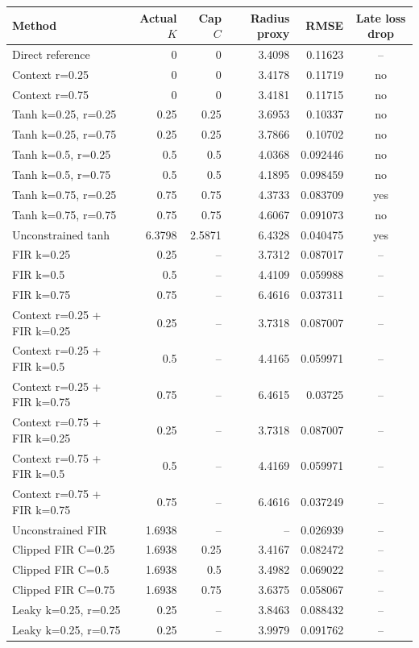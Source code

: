\begin{tabular}{lrrrrc}\toprule
Method & Actual $K$ & Cap $C$ & Radius proxy & RMSE & Late loss drop\\\midrule
Direct reference & 0 & 0 & 3.4098 & 0.11623 & -- \\
Context r=0.25 & 0 & 0 & 3.4178 & 0.11719 & no \\
Context r=0.75 & 0 & 0 & 3.4181 & 0.11715 & no \\
Tanh k=0.25, r=0.25 & 0.25 & 0.25 & 3.6953 & 0.10337 & no \\
Tanh k=0.25, r=0.75 & 0.25 & 0.25 & 3.7866 & 0.10702 & no \\
Tanh k=0.5, r=0.25 & 0.5 & 0.5 & 4.0368 & 0.092446 & no \\
Tanh k=0.5, r=0.75 & 0.5 & 0.5 & 4.1895 & 0.098459 & no \\
Tanh k=0.75, r=0.25 & 0.75 & 0.75 & 4.3733 & 0.083709 & yes \\
Tanh k=0.75, r=0.75 & 0.75 & 0.75 & 4.6067 & 0.091073 & no \\
Unconstrained tanh & 6.3798 & 2.5871 & 6.4328 & 0.040475 & yes \\
FIR k=0.25 & 0.25 & -- & 3.7312 & 0.087017 & -- \\
FIR k=0.5 & 0.5 & -- & 4.4109 & 0.059988 & -- \\
FIR k=0.75 & 0.75 & -- & 6.4616 & 0.037311 & -- \\
Context r=0.25 + FIR k=0.25 & 0.25 & -- & 3.7318 & 0.087007 & -- \\
Context r=0.25 + FIR k=0.5 & 0.5 & -- & 4.4165 & 0.059971 & -- \\
Context r=0.25 + FIR k=0.75 & 0.75 & -- & 6.4615 & 0.03725 & -- \\
Context r=0.75 + FIR k=0.25 & 0.25 & -- & 3.7318 & 0.087007 & -- \\
Context r=0.75 + FIR k=0.5 & 0.5 & -- & 4.4169 & 0.059971 & -- \\
Context r=0.75 + FIR k=0.75 & 0.75 & -- & 6.4616 & 0.037249 & -- \\
Unconstrained FIR & 1.6938 & -- & -- & 0.026939 & -- \\
Clipped FIR C=0.25 & 1.6938 & 0.25 & 3.4167 & 0.082472 & -- \\
Clipped FIR C=0.5 & 1.6938 & 0.5 & 3.4982 & 0.069022 & -- \\
Clipped FIR C=0.75 & 1.6938 & 0.75 & 3.6375 & 0.058067 & -- \\
Leaky k=0.25, r=0.25 & 0.25 & -- & 3.8463 & 0.088432 & -- \\
Leaky k=0.25, r=0.75 & 0.25 & -- & 3.9979 & 0.091762 & -- \\

\end{tabular}
